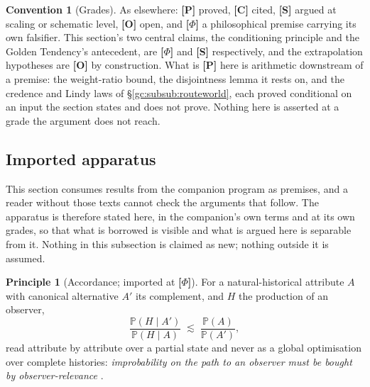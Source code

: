 \documentclass[11pt]{article}
\numberwithin{equation}{section}
\theoremstyle{plain}
\theoremstyle{definition}
\newtheorem{convention}[theorem]{Convention}
\newtheorem{principle}{Principle}
\theoremstyle{remark}
\newcommand{\PP}{\mathbb{P}}
\begin{document}
\begin{convention}[Grades]\label{gc:conv:grades}
As elsewhere: \textbf{[P]} proved, \textbf{[C]} cited, \textbf{[S]}
argued at scaling or schematic level, \textbf{[O]} open, and
\textbf{[$\Phi$]} a philosophical premise carrying its own falsifier.
This section's two central claims, the conditioning principle and the
Golden Tendency's antecedent, are \textbf{[$\Phi$]} and \textbf{[S]}
respectively, and the extrapolation hypotheses are \textbf{[O]} by
construction. What is \textbf{[P]} here is arithmetic downstream of a
premise: the weight-ratio bound, the disjointness lemma it rests on, and
the credence and Lindy laws of \S\ref{gc:subsub:routeworld}, each proved
conditional on an input the section states and does not prove. Nothing
here is asserted at a grade the argument does not reach.
\end{convention}

\subsection{Imported apparatus}\label{gc:sub:imported}

This section consumes results from the companion program as premises,
and a reader without those texts cannot check the arguments that follow.
The apparatus is therefore stated here, in the companion's own terms and
at its own grades, so that what is borrowed is visible and what is
argued here is separable from it. Nothing in this subsection is claimed
as new; nothing outside it is assumed.

\begin{principle}[Accordance; imported at \textbf{[$\Phi$]}]
\label{gc:prin:accordance}
For a natural-historical attribute $A$ with canonical alternative $A'$
its complement, and $H$ the production of an observer,
\begin{equation}\label{gc:eq:accordance}
\frac{\PP(H\mid A')}{\PP(H\mid A)}\;\lesssim\;\frac{\PP(A)}{\PP(A')},
\end{equation}
read attribute by attribute over a partial state and never as a global
optimisation over complete histories: \emph{improbability on the path to
an observer must be bought by observer-relevance}
\cite{Nexus, NexicFoundation}.
\end{principle}
\end{document}
